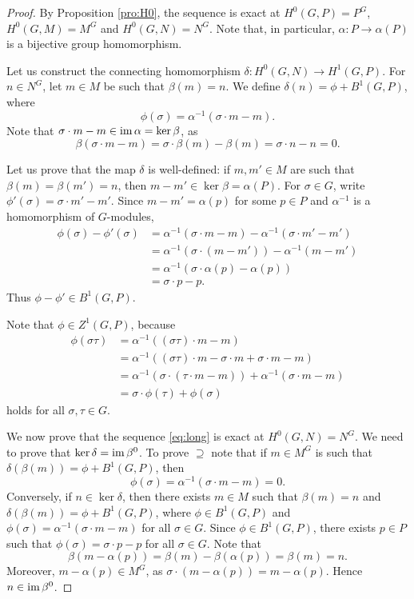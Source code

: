 \begin{proof}
    By Proposition \ref{pro:H0}, the 
    sequence is exact at $H^0(G,P)=P^G$, 
    $H^0(G,M)=M^G$ and 
    $H^0(G,N)=N^G$. Note that, in particular, 
    $\alpha\colon P\to\alpha(P)$ is a bijective group homomorphism. 


    Let us construct the connecting
    homomorphism $\delta\colon H^0(G,N)\to H^1(G,P)$. For 
    $n\in N^G$, let $m\in M$ be such that 
    $\beta(m)=n$. We define $\delta(n)=\phi+B^1(G,P)$, where 
    \[
    \phi(\sigma)=\alpha^{-1}(\sigma\cdot m-m).
    \]
    Note that $\sigma\cdot m-m\in\operatorname{im}\alpha=\ker\beta$, as 
    \[
    \beta(\sigma\cdot m-m)=\sigma\cdot \beta(m)-\beta(m)=\sigma\cdot n-n=0.
    \]

    Let us prove that the map $\delta$ is well-defined: if $m,m'\in M$ are such that
    $\beta(m)=\beta(m')=n$, then  $m-m'\in\ker\beta=\alpha(P)$. 
    For $\sigma\in G$, write $\phi'(\sigma)=\sigma\cdot m'-m'$. 
    Since  
    $m-m'=\alpha(p)$ for some $p\in P$ and  
    $\alpha^{-1}$ is a homomorphism of $G$-modules, 
    \begin{align*}
    \phi(\sigma)-\phi'(\sigma)&=\alpha^{-1}(\sigma\cdot m-m)
    -\alpha^{-1}(\sigma\cdot m'-m')\\
    &=\alpha^{-1}(\sigma\cdot (m-m'))-\alpha^{-1}(m-m')\\
    &=\alpha^{-1}(\sigma\cdot\alpha(p)-\alpha(p))\\
    &=\sigma\cdot p-p.
    \end{align*}
    Thus $\phi-\phi'\in B^1(G,P)$. 

    Note that $\phi\in Z^1(G,P)$, because
    \begin{align*}
    \phi(\sigma\tau)&=\alpha^{-1}((\sigma\tau)\cdot m-m)\\
    &=\alpha^{-1}((\sigma\tau)\cdot m-\sigma\cdot m+\sigma\cdot m-m)\\
    &=\alpha^{-1}(\sigma\cdot (\tau\cdot m-m))+\alpha^{-1}(\sigma\cdot m-m)\\
    &=\sigma\cdot\phi(\tau)+\phi(\sigma)
    \end{align*}
    holds for all $\sigma,\tau\in G$. 
    
    We now prove that the sequence \eqref{eq:long}
    is exact at $H^0(G,N)=N^G$. We need to prove that $\ker\delta=\operatorname{im}\beta^0$. To prove $\supseteq$ note that if $m\in M^G$ is such that 
    $\delta(\beta(m))=\phi+B^1(G,P)$, then 
    \[
    \phi(\sigma)=\alpha^{-1}(\sigma\cdot m-m)=0.
    \]
    Conversely, if $n\in\ker\delta$, then there exists $m\in M$ such that $\beta(m)=n$ and
    $\delta(\beta(m))=\phi+B^1(G,P)$, where $\phi\in B^1(G,P)$ and 
    $\phi(\sigma)=\alpha^{-1}(\sigma\cdot m-m)$ for all $\sigma\in G$. Since $\phi\in B^1(G,P)$, there
    exists $p\in P$ such that $\phi(\sigma)=\sigma\cdot p-p$ for all $\sigma\in G$. Note that 
    \[
    \beta(m-\alpha(p))=\beta(m)-\beta(\alpha(p))=\beta(m)=n.
    \]
    Moreover, $m-\alpha(p)\in M^G$, as $\sigma\cdot (m-\alpha(p))=m-\alpha(p)$. Hence $n\in\operatorname{im}\beta^0$. 


\end{proof}
